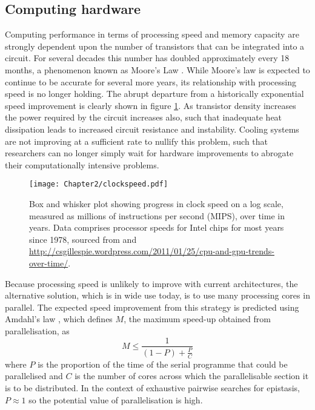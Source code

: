 \subsection{Computing hardware}

Computing performance in terms of processing speed and memory capacity are strongly dependent upon the number of transistors that can be integrated into a circuit. For several decades this number has doubled approximately every 18 months, a phenomenon known as Moore's Law \citep{Moore2006}. While Moore's law is expected to continue to be accurate for several more years, its relationship with processing speed is no longer holding. The abrupt departure from a historically exponential speed improvement is clearly shown in figure \ref{fig:clockspeed}. As transistor density increases the power required by the circuit increases also, such that inadequate heat dissipation leads to increased circuit resistance and instability. Cooling systems are not improving at a sufficient rate to nullify this problem, such that researchers can no longer simply wait for hardware improvements to abrogate their computationally intensive problems.

\begin{figure}
\begin{center}
\texttt{[image: Chapter2/clockspeed.pdf]}
\caption[CPU clockspeed changes over time]{Box and whisker plot showing progress in clock speed on a log scale, measured as millions of instructions per second (MIPS), over time in years. Data comprises processor speeds for Intel chips for most years since 1978, sourced from \cite{McKenney2011} and \href{http://csgillespie.wordpress.com/2011/01/25/cpu-and-gpu-trends-over-time/}{http://csgillespie.wordpress.com/2011/01/25/cpu-and-gpu-trends-over-time/}.
}
\label{fig:clockspeed}
\end{center}
\end{figure}


Because processing speed is unlikely to improve with current architectures, the alternative solution, which is in wide use today, is to use many processing cores in parallel. The expected speed improvement from this strategy is predicted using Amdahl's law \citep{Amdahl1967}, which defines $M$, the maximum speed-up obtained from parallelisation, as
\begin{equation}
\label{eq:amdahl}
M \leq \frac{1}{(1-P) + \frac{P}{C}}
\end{equation}
where $P$ is the proportion of the time of the serial programme that could be parallelised and $C$ is the number of cores across which the parallelisable section it is to be distributed. In the context of exhaustive pairwise searches for epistasis, $P \approx 1$ so the potential value of parallelisation is high.

